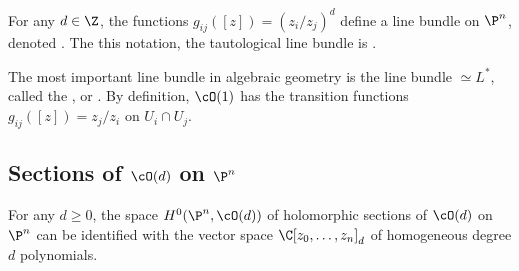 \documentclass[11pt]{report}
\begin{document}
\begin{defn}
For any $d \in \Z$, the functions $g_{ij}([z])=(z_i/z_j)^d$ define a line bundle on $\P^n$, denoted . The this notation, the tautological line bundle is .
\end{defn}

\begin{rmk}
The most important line bundle in algebraic geometry is the line bundle  $\simeq L^*$, called the , or . By definition, $\cO(1)$ has the transition functions $g_{ij}([z])=z_j/z_i$ on $U_i \cap U_j$.
\end{rmk}

\subsection{\texorpdfstring{Sections of $\cO(d)$ on $\P^n$}{Sections of O(d) on Pn}}

\begin{claim}
For any $d \ge 0$, the space $H^0(\P^n,\cO(d))$ of holomorphic sections of $\cO(d)$ on $\P^n$ can be identified with the vector space $\C[z_0,\dots,z_n]_d$ of homogeneous degree $d$ polynomials.
\end{claim}
\end{document}
